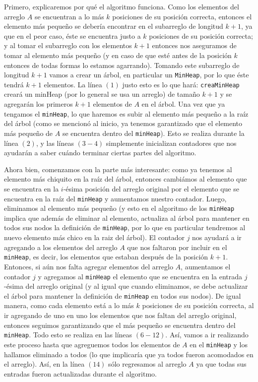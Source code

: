 \documentclass[letterpaper,11pt]{article}
\begin{document}
\begin{enumerate}
    Primero, explicaremos por qué el algoritmo funciona. Como los elementos del 
    arreglo $A$ se encuentran a lo más $k$ posiciones de su posición correcta,
    entonces el elemento más pequeño se debería encontrar en el subarreglo 
    de longitud $k+1$, ya que en el peor caso, éste se encuentra justo a $k$ 
    posiciones de su posición correcta; y al tomar el subarreglo con los 
    elementos $k+1$ entonces nos aseguramos de tomar al elemento más pequeño
    (y en caso de que esté antes de la posición $k$ entonces de todas formas 
    lo estamos agarrando). Tomando este subarreglo de longitud $k+1$ vamos a 
    crear un árbol, en particular un \texttt{MinHeap}, por lo que éste tendrá 
    $k+1$ elementos. La línea $(1)$ justo esto es lo que hará: 
    \texttt{creaMinHeap} creará un minHeap (por lo general se usa un arreglo) de 
    tamaño $k+1$ y se agregarán los primeros $k+1$ elementos de $A$ en el árbol.
    Una vez que ya tengamos el \texttt{minHeap}, lo que haremos es subir al 
    elemento más pequeño a la raíz del árbol (como se mencionó al inicio, ya 
    tenemos garantizado que el elemento más pequeño de $A$ se encuentra dentro 
    del \texttt{minHeap}). Esto se realiza durante la línea $(2)$, y las líneas 
    $(3 - 4)$ simplemente inicializan contadores que nos ayudarán a saber cuándo 
    terminar ciertas partes del algoritmo.
    
    Ahora bien, comenzamos con la parte más interesante: como ya tenemos al 
    elemento más chiquito en la raíz del árbol, entonces cambiámos al elemento 
    que se encuentra en la $i$-ésima posición del arreglo original por el 
    elemento que se encuentra en la raíz del \texttt{minHeap} y aumentamos 
    nuestro contador. Luego, eliminamos al elemento más pequeño (y esto en el 
    algoritmo de los \texttt{minHeap} implica que además de eliminar al elemento, 
    actualiza al árbol para mantener en todos sus nodos la definición de 
    \texttt{minHeap}, por lo que en particular tendremos al nuevo elemento más 
    chico en la raiz del árbol). El contador $j$ nos ayudará a ir 
    agregando a los elementos del arreglo $A$ que nos faltaron por incluir en 
    el \texttt{minHeap}, es decir, los elementos que estaban después de la 
    posición $k+1$. Entonces, si aún nos falta agregar elementos del arreglo $A$, 
    aumentamos el contador $j$ y agregamos al \texttt{minHeap} el elemento que 
    se encuentra en la entrada $j$-ésima del arreglo original (y al igual que 
    cuando eliminamos, se debe actualizar el árbol para mantener la definición 
    de \texttt{minHeap} en todos sus nodos). De igual manera, como cada elemento 
    está a lo más $k$ posiciones de su posición correcta, al ir agregando de 
    uno en uno los elementos que nos faltan del arreglo original, entonces 
    seguimos garantizando que el más pequeño se encuentra dentro del 
    \texttt{minHeap}. Todo esto se realiza en las líneas $(6 - 12)$. Así,
    vamos a ir realizando este proceso hasta que agreguemos todos los elementos
    de $A$ en el \texttt{minHeap} y los hallamos eliminado a todos (lo que 
    implicaría que ya todos fueron acomodados en el arreglo). Así, en la 
    línea $(14)$ sólo regresamos al arreglo $A$ ya que todas sus entradas fueron
    actualizadas durante el algoritmo.


\end{enumerate}
\end{document}
